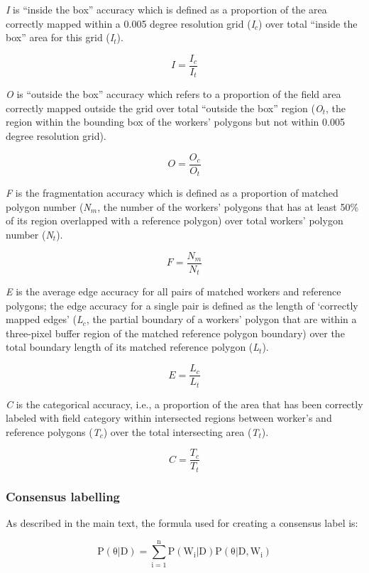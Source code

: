 \documentclass[
  11pt,
  a4paper]{article}
\begin{document}
\emph{I} is ``inside the box'' accuracy which is defined as a proportion
of the area correctly mapped within a 0.005 degree resolution grid
(\emph{I\(_c\)}) over total ``inside the box'' area for this grid
(\emph{I\(_t\)}).

\[ I=\frac{I_c}{I_t}\]

\emph{O} is ``outside the box'' accuracy which refers to a proportion of
the field area correctly mapped outside the grid over total ``outside
the box'' region (\emph{O\(_t\)}, the region within the bounding box of
the workers' polygons but not within 0.005 degree resolution grid).

\[ O=\frac{O_c}{O_t}\]

\emph{F} is the fragmentation accuracy which is defined as a proportion
of matched polygon number (\emph{N\(_m\)}, the number of the workers'
polygons that has at least 50\% of its region overlapped with a
reference polygon) over total workers' polygon number (\emph{N\(_t\)}).

\[ F=\frac{N_m}{N_t}\]

\emph{E} is the average edge accuracy for all pairs of matched workers
and reference polygons; the edge accuracy for a single pair is defined
as the length of `correctly mapped edges' (\emph{L\(_c\)}, the partial
boundary of a workers' polygon that are within a three-pixel buffer
region of the matched reference polygon boundary) over the total
boundary length of its matched reference polygon (\emph{L\(_t\)}).

\[ E=\frac{L_c}{L_t}\]

\emph{C} is the categorical accuracy, i.e., a proportion of the area
that has been correctly labeled with field category within intersected
regions between worker's and reference polygons (\emph{T\(_c\)}) over
the total intersecting area (\emph{T\(_t\)}).

\[ C=\frac{T_c}{T_t}\]

\hypertarget{consensus-labelling}{%
\subsubsection{Consensus labelling}\label{consensus-labelling}}

As described in the main text, the formula used for creating a consensus
label is:

\begin{equation} \label{eq:main}
\mathrm{P(\theta|D)=\sum_{i=1}^{n}P(W_i|D)P(\theta|D, W_i)}
\end{equation}
\end{document}
